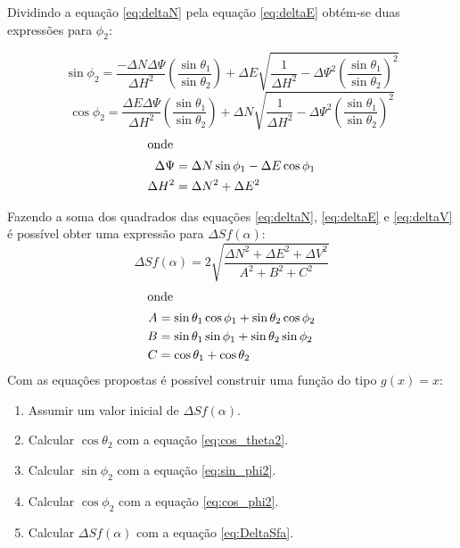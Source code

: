 \documentclass[final,3p,12pt]{elsarticle}
\begin{document}
Dividindo a equação \ref{eq:deltaN} pela equação \ref{eq:deltaE} obtém-se duas expressões para $\phi_2$:

\begin{equation} \label{eq:sin_phi2}
    \sin \phi_2 = \frac{-\Delta N \Delta \Psi}{\Delta H^2} \left( \frac{\sin \theta_1}{\sin \theta_2} \right) + \Delta E \sqrt{\frac{1}{\Delta H^2} - \Delta \Psi^2 \left( \frac{\sin \theta_1}{\sin \theta_2} \right)^2} 
\end{equation}
\begin{equation} \label{eq:cos_phi2}
    \cos \phi_2 = \frac{\Delta E \Delta \Psi}{\Delta H^2} \left( \frac{\sin \theta_1}{\sin \theta_2} \right) + \Delta N \sqrt{\frac{1}{\Delta H^2} - \Delta \Psi^2 \left( \frac{\sin \theta_1}{\sin \theta_2} \right)^2} 
\end{equation}
\begin{align*}
    \intertext{onde}
    \Delta \Psi &= \Delta N \sin \phi_1 - \Delta E \cos \phi_1 \\
    \Delta H^2 &= \Delta N^2 + \Delta E^2
\end{align*}

Fazendo a soma dos quadrados das equações \ref{eq:deltaN}, \ref{eq:deltaE} e \ref{eq:deltaV} é possível obter uma expressão para $\Delta S f(\alpha)$:
\begin{equation} \label{eq:DeltaSfa}
    \Delta S f(\alpha) = 2 \sqrt{\frac{\Delta N^2 + \Delta E^2 + \Delta V^2}{A^2+B^2+C^2}}
\end{equation}
\begin{align*}
    \intertext{onde}
    A &= \sin \theta_1 \cos \phi_1 + \sin \theta_2 \cos \phi_2 \\
    B &= \sin \theta_1 \sin \phi_1 + \sin \theta_2 \sin \phi_2 \\
    C &= \cos \theta_1 + \cos \theta_2
\end{align*}
Com as equações propostas é possível construir uma função do tipo $g(x)=x$:

\begin{enumerate}
    \item Assumir um valor inicial de $\Delta S f(\alpha)$.
    \item Calcular $\cos \theta_2$ com a equação \ref{eq:cos_theta2}.
    \item Calcular $\sin \phi_2$ com a equação \ref{eq:sin_phi2}.
    \item Calcular $\cos \phi_2$ com a equação \ref{eq:cos_phi2}.
    \item Calcular $\Delta S f(\alpha)$ com a equação \ref{eq:DeltaSfa}.
\end{enumerate}
\end{document}
